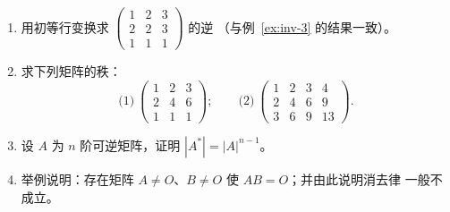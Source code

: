 \begin{enumerate}[label=\arabic*., itemsep=2pt]
  的逆矩阵。
\item 用初等行变换求
  $\begin{pmatrix} 1 & 2 & 3 \\ 2 & 2 & 3 \\ 1 & 1 & 1 \end{pmatrix}$ 的逆
  （与例~\ref{ex:inv-3} 的结果一致）。
\item 求下列矩阵的秩：
  \[
  \text{(1)}\ \begin{pmatrix} 1 & 2 & 3 \\ 2 & 4 & 6 \\ 1 & 1 & 1 \end{pmatrix};
  \qquad
  \text{(2)}\ \begin{pmatrix} 1 & 2 & 3 & 4 \\ 2 & 4 & 6 & 9 \\ 3 & 6 & 9 & 13 \end{pmatrix}.
  \]
\item 设 $A$ 为 $n$ 阶可逆矩阵，证明 $|A^*|=|A|^{n-1}$。
\item 举例说明：存在矩阵 $A\neq O$、$B\neq O$ 使 $AB=O$；并由此说明消去律
  一般不成立。
\end{enumerate}
